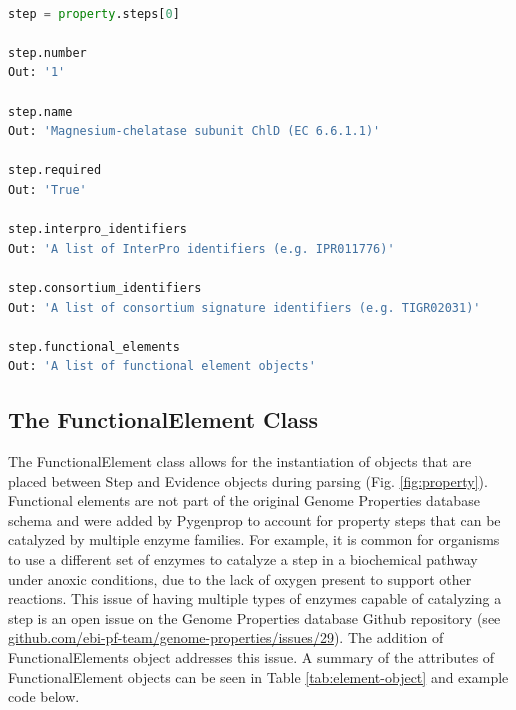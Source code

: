 \begin{lstlisting}[language=Python]

step = property.steps[0]
	
step.number
Out: '1'

step.name
Out: 'Magnesium-chelatase subunit ChlD (EC 6.6.1.1)'

step.required
Out: 'True'

step.interpro_identifiers
Out: 'A list of InterPro identifiers (e.g. IPR011776)'

step.consortium_identifiers 
Out: 'A list of consortium signature identifiers (e.g. TIGR02031)'

step.functional_elements
Out: 'A list of functional element objects'

\end{lstlisting}

\subsection{The FunctionalElement Class}

The FunctionalElement class allows for the instantiation of objects that are placed between Step and Evidence objects during parsing (Fig. \ref{fig:property}). Functional elements are not part of the original Genome Properties database schema and were added by Pygenprop to account for property steps that can be catalyzed by multiple enzyme families. For example, it is common for organisms to use a different set of enzymes to catalyze a step in a biochemical pathway under anoxic conditions, due to the lack of oxygen present to support other reactions. This issue of having multiple types of enzymes capable of catalyzing a step is an open issue on the Genome Properties database Github repository (see \href{github.com/ebi-pf-team/genome-properties/issues/29}{github.com/ebi-pf-team/genome-properties/issues/29}). The addition of FunctionalElements object addresses this issue. A summary of the attributes of FunctionalElement objects can be seen in Table \ref{tab:element-object} and example code below.

